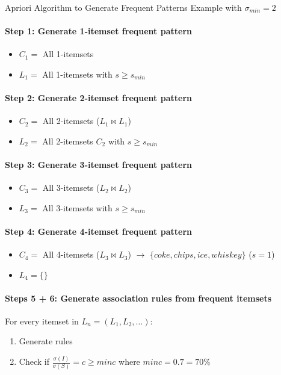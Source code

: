 \begin{KR}{Apriori Algorithm to Generate Frequent Patterns}
Example with $\sigma_{min} = 2$

\paragraph{Step 1: Generate 1-itemset frequent pattern}
\begin{itemize}
    \item $C_1 =$ All 1-itemsets
    \item $L_1 =$ All 1-itemsets with $s \geq s_{min}$
\end{itemize}


\paragraph{Step 2: Generate 2-itemset frequent pattern}
\begin{itemize}
    \item $C_2 =$ All 2-itemsets ($L_1 \bowtie L_1$)
    \item $L_2 =$ All 2-itemsets $C_2$ with $s \geq s_{min}$
\end{itemize}


\paragraph{Step 3: Generate 3-itemset frequent pattern}
\begin{itemize}
    \item $C_3 =$ All 3-itemsets ($L_2 \bowtie L_2$)
    \item $L_3 =$ All 3-itemsets with $s \geq s_{min}$
\end{itemize}


\paragraph{Step 4: Generate 4-itemset frequent pattern}
\begin{itemize}
    \item $C_4 =$ All 4-itemsets ($L_3 \bowtie L_3$) $\rightarrow$ $\{coke, chips, ice, whiskey\}$ ($s = 1$)
    \item $L_4 = \{\}$
\end{itemize}

\paragraph{Steps 5 + 6: Generate association rules from frequent itemsets}
For every itemset in $L_n = (L_1, L_2, \ldots)$:
\begin{enumerate}
    \item Generate rules
    \item Check if $\frac{\sigma(I)}{\sigma(S)} = c \geq minc$ where $minc = 0.7 = 70\%$
\end{enumerate}
\end{KR}

